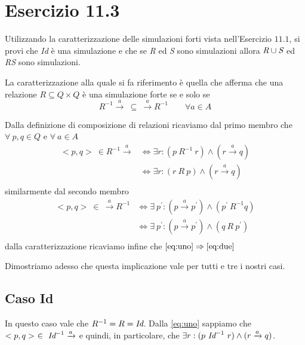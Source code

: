 		\newpage
		
	\section{Esercizio 11.3}
		Utilizzando la caratterizzazione delle simulazioni forti vista
		nell'Esercizio $11.1$, si provi che \emph{Id} è una simulazione e che se
		\emph{R} ed \emph{S} sono simulazioni allora $\emph{R} \cup \emph{S}$ ed
		\emph{RS} sono simulazioni.
		
		\sectionline
		La caratterizzazione alla quale si fa riferimento è quella che afferma che una relazione $R \subseteq Q \times Q$ è una simulazione forte se e solo se $$R^{-1} \xrightarrow{a} \ \subseteq \ \xrightarrow{a}R^{-1} \qquad \forall a \in A$$
		
		Dalla definizione di composizione di relazioni ricaviamo dal primo membro che $\forall \ p,q \in Q$ e $\forall \ a \in A$
		\begin{equation}
		\label{eq:uno}
		\begin{aligned}
		<p,q>\ \in R^{-1}\xrightarrow{a} & \Leftrightarrow \exists r: (p \ R^{-1} \ r) \land (r \xrightarrow{a} q)\\
		& \Leftrightarrow \exists r: (r \ R \ p) \land (r \xrightarrow{a} q)\\
		\end{aligned}
		\end{equation}
		similarmente dal secondo membro
		\begin{equation}
		\label{eq:due}
		\begin{aligned}
		<p,q>\ \in \ \xrightarrow{a} R^{-1} & \Leftrightarrow \exists \ p^{'}: (p \xrightarrow{a} p^{'}) \land (p^{'} \ R^{-1} q)\\
		& \Leftrightarrow \exists \ p^{'}: (p \xrightarrow{a} p^{'}) \land (q \ R \ p^{'})\\
		\end{aligned}
		\end{equation}
		dalla caratterizzazione ricaviamo infine che $\eqref{eq:uno} \Rightarrow \eqref{eq:due}$
		
		Dimostriamo adesso che questa implicazione vale per tutti e tre i nostri casi.
		
		\subsection{Caso Id}
		
		In questo caso vale che $R^{-1} = R = \emph{Id}$. Dalla \eqref{eq:uno} sappiamo che $<p,q>\ \in \ \emph{Id}^{-1} \xrightarrow{a}$ e quindi, in particolare, che $\exists r: (p \ \emph{Id}^{-1} \ r) \land (r \xrightarrow{a} q)$.
		
